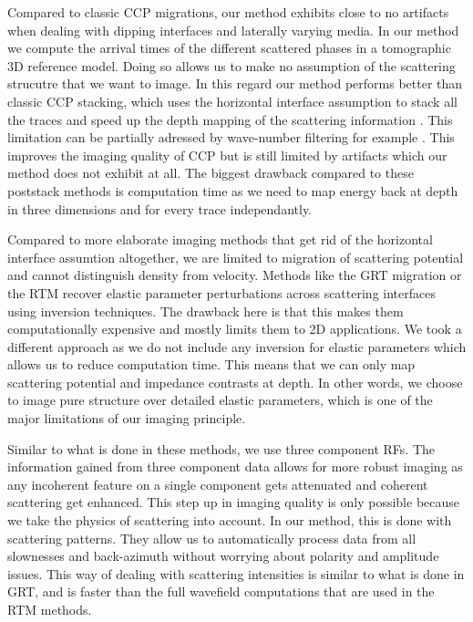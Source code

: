 \documentclass[10pt,a4paper]{article}
\begin{document}
Compared to classic CCP migrations, our method exhibits close to no artifacts when dealing with dipping interfaces and laterally varying media.
In our method we compute the arrival times of the different scattered phases in a tomographic 3D reference model.
Doing so allows us to make no assumption of the scattering strucutre that we want to image.
In this regard our method performs better than classic CCP stacking, which uses the horizontal interface assumption to stack all the traces and speed up the depth mapping of the scattering information \citep{duek_jgr_97}.
This limitation can be partially adressed by wave-number filtering for example \citep[one-way wave equation][]{chen_jgr_05}.
This improves the imaging quality of CCP but is still limited by artifacts which our method does not exhibit at all.
The biggest drawback compared to these poststack methods is computation time as we need to map energy back at depth in three dimensions and for every trace independantly.

Compared to more elaborate imaging methods that get rid of the horizontal interface assumtion altogether, we are limited to migration of scattering potential and cannot distinguish density from velocity.
Methods like the GRT migration \citep[e.g.,][]{bost_jgr_01} or the RTM \citep[e.g.,][]{burd_gji_13} recover elastic parameter perturbations across scattering interfaces using inversion techniques.
The drawback here is that this makes them computationally expensive and mostly limits them to 2D applications.
We took a different approach as we do not include any inversion for elastic parameters which allows us to reduce computation time.
This means that we can only map scattering potential and impedance contrasts at depth.
In other words, we choose to image pure structure over detailed elastic parameters, which is one of the major limitations of our imaging principle.

Similar to what is done in these methods, we use three component RFs.
The information gained from three component data allows for more robust imaging as any incoherent feature on a single component gets attenuated and coherent scattering get enhanced.
This step up in imaging quality is only possible because we take the physics of scattering into account.
In our method, this is done with scattering patterns.
They allow us to automatically process data from all slownesses and back-azimuth without worrying about polarity and amplitude issues.
This way of dealing with scattering intensities is similar to what is done in GRT, and is faster than the full wavefield computations that are used in the RTM methods.
\end{document}
